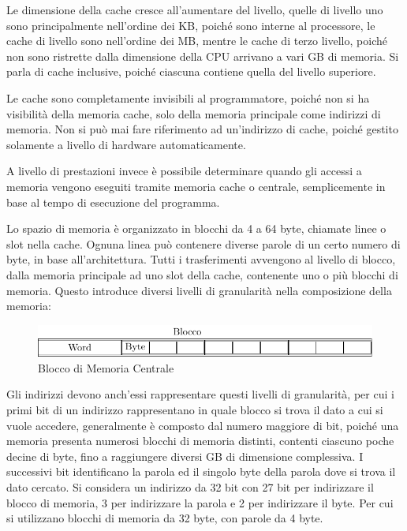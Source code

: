\documentclass{article}
\numberwithin{equation}{subsection}
\begin{document}
Le dimensione della cache cresce all'aumentare del livello, quelle di livello uno sono principalmente nell'ordine dei KB, poiché sono interne al processore, le cache di 
livello sono nell'ordine dei MB, mentre le cache di terzo livello, poiché non sono ristrette dalla dimensione della CPU arrivano a vari GB di memoria. 
Si parla di cache inclusive, poiché ciascuna contiene quella del livello superiore. 

Le cache sono completamente invisibili al programmatore, poiché non si ha visibilità della memoria cache, solo della memoria principale come indirizzi di memoria. Non si 
può mai fare riferimento ad un'indirizzo di cache, poiché gestito solamente a livello di hardware automaticamente. 

A livello di prestazioni invece è possibile determinare quando gli accessi a memoria vengono eseguiti tramite memoria cache o centrale, semplicemente in base al tempo di 
esecuzione del programma. 

Lo spazio di memoria è organizzato in blocchi da 4 a 64 byte, chiamate linee o slot nella cache. Ognuna linea può contenere diverse parole di un certo numero di byte, in base 
all'architettura. Tutti i trasferimenti avvengono al livello di blocco, dalla memoria principale ad uno slot della cache, contenente uno o più blocchi di memoria. 
Questo introduce diversi livelli di granularità nella composizione della memoria: 

\begin{figure}[H]%
    \centering%
    \includegraphics{blocco-memoria.pdf}%
    \caption{Blocco di Memoria Centrale}%
\end{figure}

Gli indirizzi devono anch'essi rappresentare questi livelli di granularità, per cui i primi bit di un indirizzo rappresentano in quale blocco si trova il dato a cui si vuole 
accedere, generalmente è composto dal numero maggiore di bit, poiché una memoria presenta numerosi blocchi di memoria distinti, contenti ciascuno poche decine di byte, fino 
a raggiungere diversi GB di dimensione complessiva. I successivi bit identificano la parola ed il singolo byte della parola dove si trova il dato cercato. 
Si considera un indirizzo da 32 bit con 27 bit per indirizzare il blocco di memoria, 3 per indirizzare la parola e 2 per indirizzare il byte. Per cui si utilizzano blocchi 
di memoria da 32 byte, con parole da 4 byte. 
\end{document}
